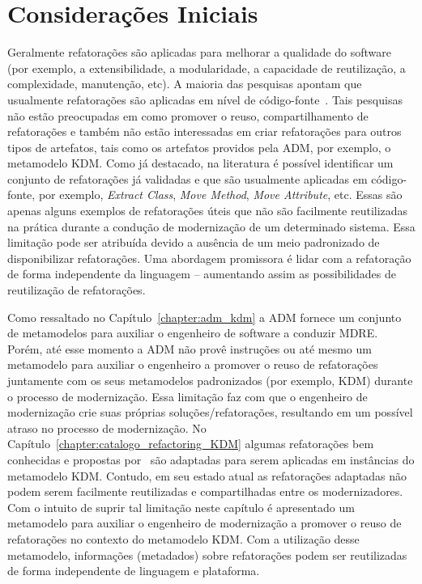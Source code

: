 \section{Considerações Iniciais}\label{sec:consideracoes_iniciais}
Geralmente refatorações são aplicadas para melhorar a qualidade do software (por exemplo, a extensibilidade, a modularidade, a capacidade de reutilização, a complexidade, manutenção, etc). 
A maioria das pesquisas apontam que usualmente refatorações são aplicadas em nível de código-fonte~\cite{Fowler1999, Demeyer1, Demeyer2, OPDYKE_1992}. Tais pesquisas não estão preocupadas em como promover o reuso, compartilhamento de refatorações e também não estão interessadas em criar refatorações para outros tipos de artefatos, tais como os artefatos providos pela ADM, por exemplo, o metamodelo KDM. 
%
Como já destacado, na literatura é possível identificar um conjunto de refatorações já validadas e que são usualmente aplicadas em código-fonte, por exemplo, \textit{Extract Class}, \textit{Move Method}, \textit{Move Attribute}, etc. Essas são apenas alguns exemplos de refatorações úteis que não são facilmente reutilizadas na prática durante a condução de modernização de um determinado sistema. Essa limitação pode ser atribuída devido a ausência de um meio padronizado de disponibilizar refatorações. 
Uma abordagem promissora é lidar com a refatoração de forma independente da linguagem – aumentando assim as possibilidades de reutilização de refatorações.

Como ressaltado no Capítulo~\ref{chapter:adm_kdm} a ADM fornece um conjunto de metamodelos para auxiliar o engenheiro de software a conduzir MDRE. 
Porém, até esse momento a ADM não provê instruções ou até mesmo um metamodelo para auxiliar o engenheiro a promover o reuso de refatorações juntamente com os seus metamodelos padronizados (por exemplo, KDM) durante o processo de modernização. 
Essa limitação faz com que o engenheiro de modernização crie suas próprias soluções/refatorações, resultando em um possível atraso no processo de modernização. 
No Capítulo~\ref{chapter:catalogo_refactoring_KDM} algumas refatorações bem conhecidas e propostas por~ são adaptadas para serem aplicadas em instâncias do metamodelo KDM. Contudo, em seu estado atual as refatorações adaptadas não podem serem facilmente reutilizadas e compartilhadas entre os modernizadores. 
Com o intuito de suprir tal limitação neste capítulo é apresentado um metamodelo para auxiliar o engenheiro de modernização a promover o reuso de refatorações no contexto do metamodelo KDM. Com a utilização desse metamodelo, informações (metadados) sobre refatorações podem ser reutilizadas de forma independente de linguagem e plataforma. 

